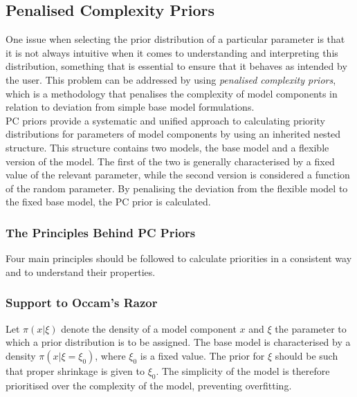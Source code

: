 \documentclass[12pt]{book}
\begin{document}
\subsection{Penalised Complexity Priors}
One issue when selecting the prior distribution of a particular parameter is that it is not always intuitive when it comes to understanding and interpreting this distribution, something that is essential to ensure that it behaves as intended by the user. This problem can be addressed by using \textit{penalised complexity priors}, which is a methodology that penalises the complexity of model components in relation to deviation from simple base model formulations.\\
PC priors provide a systematic and unified approach to calculating priority distributions for parameters of model components by using an inherited nested structure. This structure contains two models, the base model and a flexible version of the model. The first of the two is generally characterised by a fixed value of the relevant parameter, while the second version is considered a function of the random parameter. By penalising the deviation from the flexible model to the fixed base model, the PC prior is calculated.
\subsubsection{The Principles Behind PC Priors}
Four main principles should be followed to calculate priorities in a consistent way and to understand their properties.
\subsubsection*{Support to Occam's Razor} 
Let $\pi\left(x|\xi\right)$ denote the density of a model component $x$ and $\xi$ the parameter to which a prior distribution is to be assigned. The base model is characterised by a density $\pi\left(x|\xi=\xi_0\right)$, where $\xi_0$ is a fixed value. The prior for $\xi$ should be such that proper shrinkage is given to $\xi_0$. The simplicity of the model is therefore prioritised over the complexity of the model, preventing overfitting.
\end{document}
